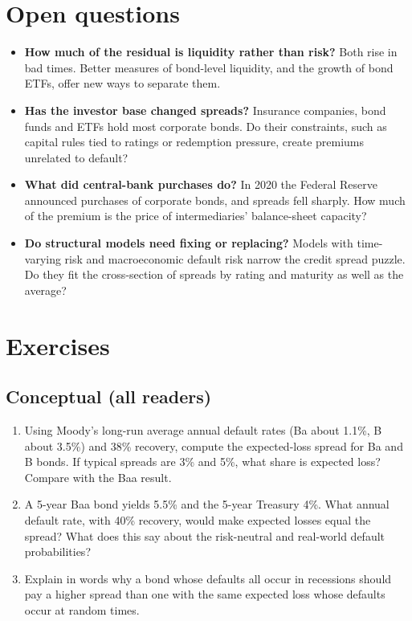 \section{Open questions}
\label{sec:17-open}

\begin{itemize}
  \item \textbf{How much of the residual is liquidity rather than risk?} Both rise in bad times. Better measures of bond-level liquidity, and the growth of bond ETFs, offer new ways to separate them.
  \item \textbf{Has the investor base changed spreads?} Insurance companies, bond funds and ETFs hold most corporate bonds. Do their constraints, such as capital rules tied to ratings or redemption pressure, create premiums unrelated to default?
  \item \textbf{What did central-bank purchases do?} In 2020 the Federal Reserve announced purchases of corporate bonds, and spreads fell sharply. How much of the premium is the price of intermediaries' balance-sheet capacity?
  \item \textbf{Do structural models need fixing or replacing?} Models with time-varying risk and macroeconomic default risk narrow the credit spread puzzle. Do they fit the cross-section of spreads by rating and maturity as well as the average?
\end{itemize}

\section*{Exercises}

\subsection*{Conceptual (all readers)}

\begin{enumerate}
  \item Using Moody's long-run average annual default rates (Ba about 1.1\%, B about 3.5\%) and 38\% recovery, compute the expected-loss spread for Ba and B bonds. If typical spreads are 3\% and 5\%, what share is expected loss? Compare with the Baa result.
  \item A 5-year Baa bond yields 5.5\% and the 5-year Treasury 4\%. What annual default rate, with 40\% recovery, would make expected losses equal the spread? What does this say about the risk-neutral and real-world default probabilities?
  \item Explain in words why a bond whose defaults all occur in recessions should pay a higher spread than one with the same expected loss whose defaults occur at random times.
\end{enumerate}

